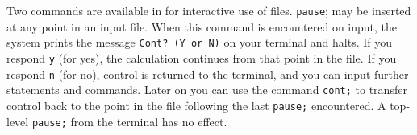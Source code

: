 \hypertarget{CONT-and-PAUSE}{}
Two commands are available in {\REDUCE} for interactive use of files.
\texttt{pause};
may be inserted at any point in an input file.  When this command is
encountered on input, the system prints the message \texttt{Cont? (Y or N)}
on your terminal and halts.  If you respond \texttt{y} (for
yes), the calculation continues from that point in the file.  If you
respond \texttt{n} (for no), control is returned to the terminal, and
you can input further statements and commands.  Later on you can use
the command
\texttt{cont;}
to transfer control back to the point in the file following the last
\texttt{pause;} encountered.  A top-level \texttt{pause;} from the
terminal has no effect.
